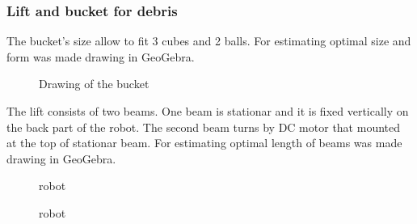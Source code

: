 \subsubsection{Lift and bucket for debris}

The bucket's size allow to fit 3 cubes and 2 balls. For estimating optimal size and form was made drawing in GeoGebra.
\begin{figure}[H]
	\begin{minipage}[h]{1\linewidth}
		\caption{Drawing of the bucket}
	\end{minipage}
\end{figure}  


The lift consists of two beams. One beam is stationar and it is fixed vertically on the back part of the robot. The second beam turns by DC motor that mounted at the top of stationar beam. For estimating optimal length of beams was made drawing in GeoGebra.
\begin{figure}[H]
	\begin{minipage}[h]{1\linewidth}
		\caption{robot}
	\end{minipage}
\end{figure}


  	\begin{figure}[H]
  		\begin{minipage}[h]{1\linewidth}
  			\caption{robot}
  		\end{minipage}
  	\end{figure}
  	
   	


\fillpage
